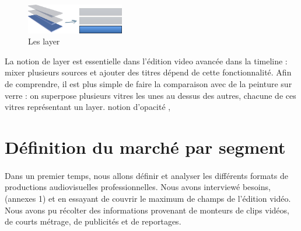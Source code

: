 \begin{figure}

  \begin{center}

    \vspace{-20pt} \includegraphics[width=0.38\textwidth]{images/layers}

  \end{center} \vspace{-20pt} \caption{Les layer} \label{Yes}

\end{figure}

La notion de layer est essentielle dans l'édition video avancée dans
la timeline : mixer plusieurs sources et ajouter des titres dépend de
cette fonctionnalité. Afin de comprendre, il est plus simple de faire
la comparaison avec de la peinture sur verre : on superpose plusieurs
vitres les unes au dessus des autres, chacune de ces vitres représentant
un layer. %
notion d'opacité , %
\newpage

\section{Définition du marché par segment}

\paragraph{}

Dans un premier temps, nous allons définir et analyser les différents
formats de productions audiovisuelles professionnelles.  Nous avons
interviewé %
besoins, (annexes 1) et en essayant de couvrir le maximum de champs de
l'édition vidéo. Nous avons pu récolter des informations provenant
de monteurs de clips vidéos, de courts métrage, de publicités et
de reportages.

\paragraph{}

